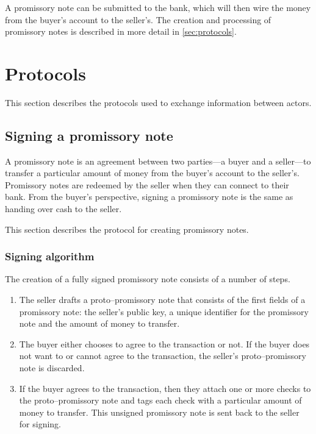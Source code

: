 \documentclass[12pt,a4paper]{article}
\begin{document}
\begin{multicols}{2}
	A promissory note can be submitted to the bank, which will then wire the money from the buyer's account to the seller's. The creation and processing of promissory notes is described in more detail in \autoref{sec:protocols}.

	\section{Protocols}
	\label{sec:protocols}
	
	This section describes the protocols used to exchange information between actors.
	
	\subsection{Signing a promissory note}

	A promissory note is an agreement between two parties---a buyer and a seller---to transfer a particular amount of money from the buyer's account to the seller's. Promissory notes are redeemed by the seller when they can connect to their bank. From the buyer's perspective, signing a promissory note is the same as handing over cash to the seller.
	
	This section describes the protocol for creating promissory notes.

	\subsubsection{Signing algorithm}
	
	The creation of a fully signed promissory note consists of a number of steps.
	
	\begin{enumerate}
		\item The seller drafts a proto--promissory note that consists of the first fields of a promissory note: the seller's public key, a unique identifier for the promissory note and the amount of money to transfer.
		
		\item The buyer either chooses to agree to the transaction or not. If the buyer does not want to or cannot agree to the transaction, the seller's proto--promissory note is discarded.
		
		\item If the buyer agrees to the transaction, then they attach one or more checks to the proto--promissory note and tags each check with a particular amount of money to transfer. This unsigned promissory note is sent back to the seller for signing.
		

\end{enumerate}
\end{multicols}
\end{document}
